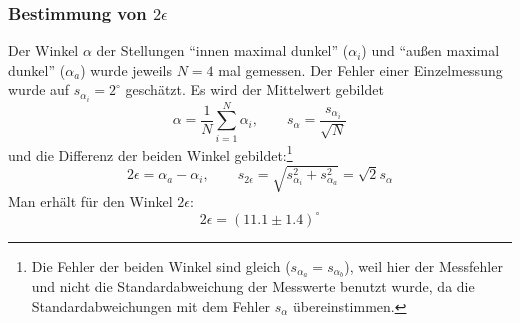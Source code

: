 \subsubsection{Bestimmung von $2\epsilon$}
Der Winkel $\alpha$ der Stellungen "`innen maximal dunkel"' ($\alpha_i$) und "`außen maximal dunkel"' ($\alpha_a$) wurde 
jeweils $N = 4$ mal gemessen. Der Fehler einer Einzelmessung wurde auf $s_{\alpha_i} = 2^\circ$ geschätzt. 
Es wird der Mittelwert gebildet
\begin{equation}
  \alpha = \frac{1}{N} \sum_{i=1}^{N} \alpha_i, \qquad s_{\alpha} = \frac{s_{\alpha_i}}{\sqrt{N}}
\end{equation}
und die Differenz der beiden Winkel gebildet:\footnote{Die Fehler der beiden Winkel sind gleich ($s_{\alpha_a} = s_{\alpha_b}$), weil hier der 
Messfehler und nicht die Standardabweichung der Messwerte benutzt wurde, da die Standardabweichungen mit dem Fehler $s_\alpha$ übereinstimmen.}
\begin{equation}
  2 \epsilon = \alpha_a - \alpha_i, \qquad s_{2\epsilon} = \sqrt{s_{\alpha_i}^2 + s_{\alpha_a}^2} = \sqrt{2} s_\alpha
\end{equation}
Man erhält für den Winkel $2\epsilon$:
\begin{equation}
  2\epsilon = (11.1 \pm 1.4)^\circ
\end{equation}